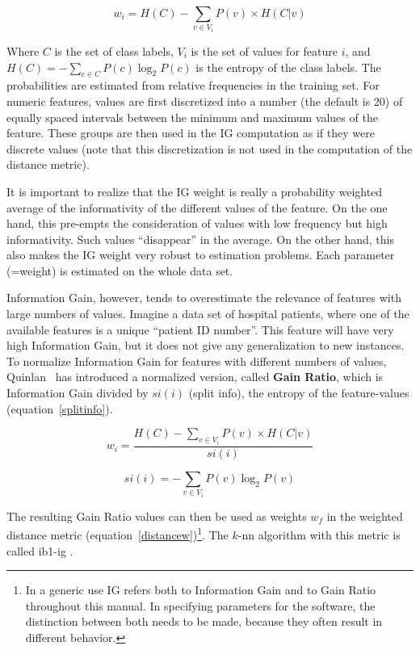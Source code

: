 \documentclass{report}
\begin{document}
\begin{equation}
w_{i} = H(C) -  \sum_{v \in V_{i}} P(v) \times H(C|v)
\label{IGgain}
\end{equation}

Where $C$ is the set of class labels, $V_{i}$ is the set of values for
feature $i$, and $H(C) = - \sum_{c \in C} P(c) \log_{2} P(c)$ is the
entropy of the class labels. The probabilities are estimated from
relative frequencies in the training set. For numeric features, values
are first discretized into a number (the default is 20) of equally
spaced intervals between the minimum and maximum values of the
feature. These groups are then used in the IG computation as if they
were discrete values (note that this discretization is not used in the
computation of the distance metric).

It is important to realize that the IG weight is really a probability
weighted average of the informativity of the different values of the
feature. On the one hand, this pre-empts the consideration of values
with low frequency but high informativity. Such values ``disappear''
in the average. On the other hand, this also makes the IG weight very
robust to estimation problems. Each parameter (=weight) is estimated
on the whole data set.

Information Gain, however, tends to overestimate the relevance of
features with large numbers of values. Imagine a data set of hospital
patients, where one of the available features is a unique ``patient ID
number''. This feature will have very high Information Gain, but it
does not give any generalization to new instances. To normalize
Information Gain for features with different numbers of values,
Quinlan~\cite{Quinlan93} has introduced a normalized version, called
{\bf Gain Ratio}, which is Information Gain divided by $si(i)$ (split info),
the entropy of the feature-values (equation~\ref{splitinfo}).

\begin{equation}
w_{i} = \frac{H(C) -  \sum_{v \in V_{i}} P(v) \times H(C|v)}{si(i)}
\label{IGgainratio}
\end{equation}

\begin{equation}
si(i) = - \sum_{v \in V_{i}} P(v) \log_{2} P(v)
\label{splitinfo}
\end{equation}

The resulting Gain Ratio values can then be used as weights $w_{f}$ in
the weighted distance metric (equation~\ref{distancew})\footnote{In a
generic use IG refers both to Information Gain and to Gain Ratio
throughout this manual. In specifying parameters for the software, the
distinction between both needs to be made, because they often result
in different behavior.}. The $k$-{\sc nn} algorithm with this
metric is called {\sc ib1-ig} \cite{Daelemans+92b}.
\end{document}
